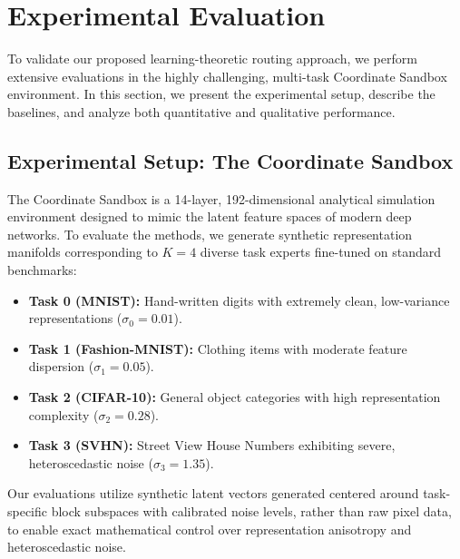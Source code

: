 \section{Experimental Evaluation}
\label{sec:experiments}

To validate our proposed learning-theoretic routing approach, we perform extensive evaluations in the highly challenging, multi-task Coordinate Sandbox environment. In this section, we present the experimental setup, describe the baselines, and analyze both quantitative and qualitative performance.

\subsection{Experimental Setup: The Coordinate Sandbox}
The Coordinate Sandbox is a 14-layer, 192-dimensional analytical simulation environment designed to mimic the latent feature spaces of modern deep networks. To evaluate the methods, we generate synthetic representation manifolds corresponding to $K = 4$ diverse task experts fine-tuned on standard benchmarks:
\begin{itemize}
    \item \textbf{Task 0 (MNIST):} Hand-written digits with extremely clean, low-variance representations ($\sigma_0 = 0.01$).
    \item \textbf{Task 1 (Fashion-MNIST):} Clothing items with moderate feature dispersion ($\sigma_1 = 0.05$).
    \item \textbf{Task 2 (CIFAR-10):} General object categories with high representation complexity ($\sigma_2 = 0.28$).
    \item \textbf{Task 3 (SVHN):} Street View House Numbers exhibiting severe, heteroscedastic noise ($\sigma_3 = 1.35$).
\end{itemize}
Our evaluations utilize synthetic latent vectors generated centered around task-specific block subspaces with calibrated noise levels, rather than raw pixel data, to enable exact mathematical control over representation anisotropy and heteroscedastic noise.

